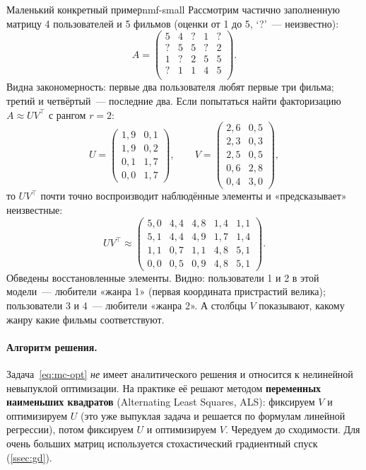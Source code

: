 \begin{example}{Маленький конкретный пример}{nmf-small}
Рассмотрим частично заполненную матрицу 4 пользователей и 5 фильмов
(оценки от 1 до 5, ‘?’~--- неизвестно):
\[
A=\begin{pmatrix}
5 & 4 & ? & 1 & ? \\
? & 5 & 5 & ? & 2 \\
1 & ? & 2 & 5 & 5 \\
? & 1 & 1 & 4 & 5 \\
\end{pmatrix}.
\]
Видна закономерность: первые два пользователя любят первые три
фильма; третий и четвёртый~--- последние два. Если попытаться найти
факторизацию $A\approx UV^{\top}$ с рангом $r=2$:
\[
U=\begin{pmatrix}1{,}9 & 0{,}1\\1{,}9 & 0{,}2\\0{,}1 & 1{,}7\\0{,}0 & 1{,}7\end{pmatrix},
\qquad
V=\begin{pmatrix}2{,}6 & 0{,}5\\2{,}3 & 0{,}3\\2{,}5 & 0{,}5\\0{,}6 & 2{,}8\\0{,}4 & 3{,}0\end{pmatrix},
\]
то $UV^{\top}$ почти точно воспроизводит наблюдённые элементы и
«предсказывает» неизвестные:
\[
UV^{\top}\approx\begin{pmatrix}5{,}0 & 4{,}4 & \boxed{4{,}8} & 1{,}4 & \boxed{1{,}1}\\
                                \boxed{5{,}1} & 4{,}4 & 4{,}9 & \boxed{1{,}7} & 1{,}4\\
                                \boxed{1{,}1} & \boxed{0{,}7} & 1{,}1 & 4{,}8 & 5{,}1\\
                                0{,}0 & 0{,}5 & 0{,}9 & 4{,}8 & 5{,}1\end{pmatrix}.
\]
Обведены восстановленные элементы. Видно: пользователи 1 и 2 в этой
модели~--- любители «жанра 1» (первая координата пристрастий
велика); пользователи 3 и 4~--- любители «жанра 2». А столбцы $V$
показывают, какому жанру какие фильмы соответствуют.
\end{example}

\paragraph{Алгоритм решения.}
Задача~\eqref{eq:mc-opt} \emph{не} имеет аналитического решения и
относится к нелинейной невыпуклой оптимизации. На практике её решают
методом \textbf{переменных наименьших квадратов} (Alternating Least
Squares, ALS): фиксируем $V$ и оптимизируем $U$ (это уже выпуклая
задача и решается по формулам линейной регрессии), потом фиксируем $U$
и оптимизируем $V$. Чередуем до сходимости. Для очень больших матриц
используется стохастический градиентный спуск (\cref{ssec:gd}).

